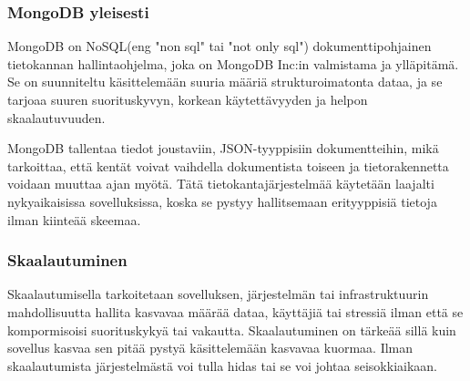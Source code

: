 







\subsubsection{MongoDB yleisesti}







MongoDB on NoSQL(eng "non sql"{} tai "not only sql"{}) dokumenttipohjainen tietokannan hallintaohjelma, joka on MongoDB Inc:in valmistama ja ylläpitämä.
Se on suunniteltu käsittelemään suuria määriä strukturoimatonta dataa, ja se tarjoaa suuren suorituskyvyn, korkean käytettävyyden ja helpon skaalautuvuuden. \citemissing
\medskip

MongoDB tallentaa tiedot joustaviin, JSON-tyyppisiin dokumentteihin, mikä tarkoittaa, että kentät voivat vaihdella dokumentista toiseen ja tietorakennetta voidaan muuttaa ajan myötä. 
Tätä tietokantajärjestelmää käytetään laajalti nykyaikaisissa sovelluksissa, koska se pystyy hallitsemaan erityyppisiä tietoja ilman kiinteää skeemaa.
\medskip






\subsubsection{Skaalautuminen}




Skaalautumisella tarkoitetaan sovelluksen, järjestelmän tai infrastruktuurin
mahdollisuutta hallita kasvavaa määrää dataa, käyttäjiä tai stressiä ilman että se kompormisoisi suorituskykyä tai vakautta.
Skaalautuminen on tärkeää sillä kuin sovellus kasvaa sen pitää pystyä käsittelemään kasvavaa kuormaa.
Ilman skaalautumista järjestelmästä voi tulla hidas tai se voi johtaa seisokkiaikaan.
\medskip

